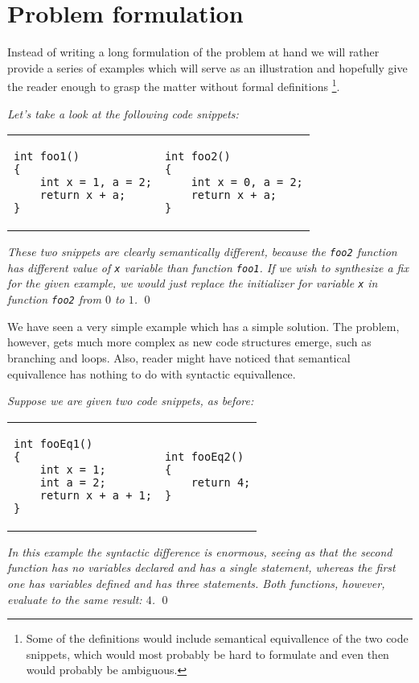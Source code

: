 \section{Problem formulation}
\label{sec:Formulation}

Instead of writing a long formulation of the problem at hand we will rather provide a series of examples which will serve as an illustration and hopefully give the reader enough to grasp the matter without formal definitions \footnote{Some of the definitions would include semantical equivallence of the two code snippets, which would most probably be hard to formulate and even then would probably be ambiguous.}.

\begin{exmp}
\textit{Let's take a look at the following code snippets:}

\begin{tabular}{ p{4.5cm} p{4.5cm} }
\begin{lstlisting}
int foo1()
{
    int x = 1, a = 2;
    return x + a;
}
\end{lstlisting}
&
\begin{lstlisting}
int foo2()
{
    int x = 0, a = 2;
    return x + a;
}
\end{lstlisting}
\end{tabular}

\textit{These two snippets are clearly semantically different, because the \texttt{foo2} function has different value of \texttt{x} variable than function \texttt{foo1}. If we wish to synthesize a fix for the given example, we would just replace the initializer for variable \texttt{x} in function \texttt{foo2}  from $0$ to $1$.}
\qed
\end{exmp}

We have seen a very simple example which has a simple solution. The problem, however, gets much more complex as new code structures emerge, such as branching and loops. Also, reader might have noticed that semantical equivallence has nothing to do with syntactic equivallence.

\begin{exmp}
\textit{Suppose we are given two code snippets, as before:}

\begin{tabular}{ p{4.5cm} p{4.5cm} }
\begin{lstlisting}
int fooEq1()
{
    int x = 1;
    int a = 2;
    return x + a + 1;
}
\end{lstlisting}
&
\begin{lstlisting}
int fooEq2()
{
    return 4;
}
\end{lstlisting}
\end{tabular}

\textit{In this example the syntactic difference is enormous, seeing as that the second function has no variables declared and has a single statement, whereas the first one has variables defined and has three statements. Both functions, however, evaluate to the same result: $4$.}
\qed
\end{exmp}

